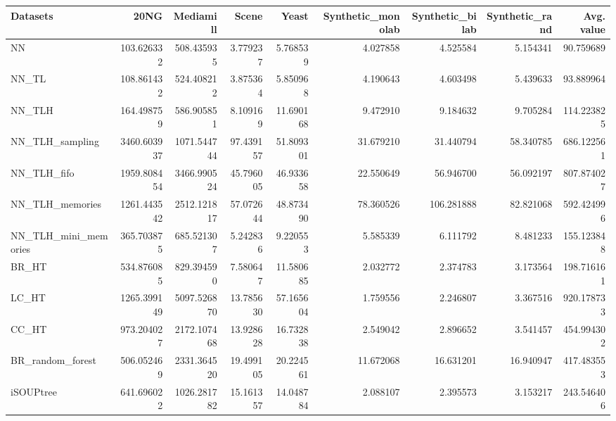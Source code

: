 \begin{tabular}{lrrrrrrrr}
\toprule
Datasets &         20NG &    Mediamill &      Scene &      Yeast &  Synthetic\_monolab &  Synthetic\_bilab &  Synthetic\_rand &  Avg. value \\
\midrule
NN                   &   103.626332 &   508.435935 &   3.779237 &   5.768539 &           4.027858 &         4.525584 &        5.154341 &   90.759689 \\
NN\_TL                &   108.861432 &   524.408212 &   3.875364 &   5.850968 &           4.190643 &         4.603498 &        5.439633 &   93.889964 \\
NN\_TLH               &   164.498759 &   586.905851 &   8.109169 &  11.690168 &           9.472910 &         9.184632 &        9.705284 &  114.223825 \\
NN\_TLH\_sampling      &  3460.603937 &  1071.544744 &  97.439157 &  51.809301 &          31.679210 &        31.440794 &       58.340785 &  686.122561 \\
NN\_TLH\_fifo          &  1959.808454 &  3466.990524 &  45.796005 &  46.933658 &          22.550649 &        56.946700 &       56.092197 &  807.874027 \\
NN\_TLH\_memories      &  1261.443542 &  2512.121817 &  57.072644 &  48.873490 &          78.360526 &       106.281888 &       82.821068 &  592.424996 \\
NN\_TLH\_mini\_memories &   365.703875 &   685.521307 &   5.242836 &   9.220553 &           5.585339 &         6.111792 &        8.481233 &  155.123848 \\
BR\_HT                &   534.876085 &   829.394590 &   7.580647 &  11.580685 &           2.032772 &         2.374783 &        3.173564 &  198.716161 \\
LC\_HT                &  1265.399149 &  5097.526870 &  13.785630 &  57.165604 &           1.759556 &         2.246807 &        3.367516 &  920.178733 \\
CC\_HT                &   973.204027 &  2172.107468 &  13.928628 &  16.732838 &           2.549042 &         2.896652 &        3.541457 &  454.994302 \\
BR\_random\_forest     &   506.052469 &  2331.364520 &  19.499105 &  20.224561 &          11.672068 &        16.631201 &       16.940947 &  417.483553 \\
iSOUPtree            &   641.696022 &  1026.281782 &  15.161357 &  14.048784 &           2.088107 &         2.395573 &        3.153217 &  243.546406 \\
\bottomrule
\end{tabular}
